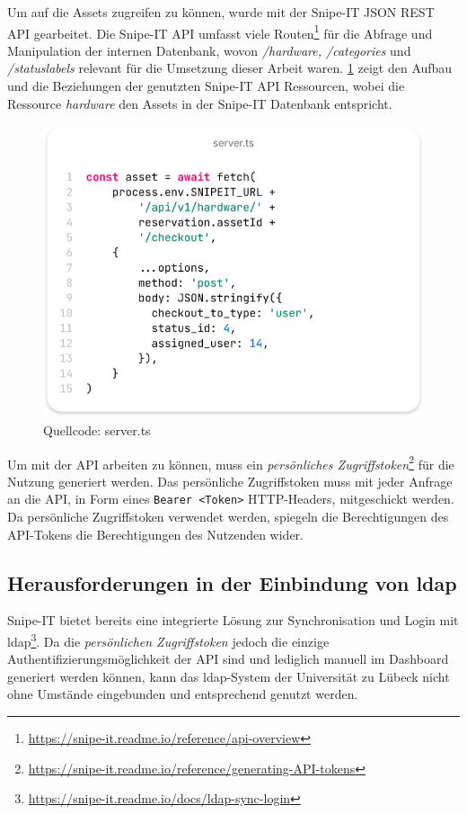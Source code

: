 Um auf die Assets zugreifen zu können, wurde mit der Snipe-IT JSON REST API gearbeitet. Die Snipe-IT
API umfasst viele Routen\footnote{\url{https://snipe-it.readme.io/reference/api-overview}} für die
Abfrage und Manipulation der internen Datenbank, wovon \textit{/hardware, /categories} und
\textit{/statuslabels} relevant für die Umsetzung dieser Arbeit waren. \ref{fig:snipe} zeigt den
Aufbau und die Beziehungen der genutzten Snipe-IT API Ressourcen, wobei die Ressource
\textit{hardware} den Assets in der Snipe-IT Datenbank entspricht.
\begin{figure}[h]
  \centering
  \includegraphics[scale=0.4]{Bilder/Code/serverts.png}
  \caption[Quellcode: server.ts]{Quellcode: server.ts}
  \label{fig:snipe}
\end{figure}

Um mit der API arbeiten zu können, muss ein \textit{persönliches
  Zugriffstoken}\footnote{\url{https://snipe-it.readme.io/reference/generating-API-tokens}} für die
Nutzung generiert werden. Das persönliche Zugriffstoken muss mit jeder Anfrage an die API, in Form
eines \lstinline{Bearer <Token>} HTTP-Headers, mitgeschickt werden. Da persönliche Zugriffstoken
verwendet werden, spiegeln die Berechtigungen des API-Tokens die Berechtigungen des Nutzenden
wider.

\subsection{Herausforderungen in der Einbindung von \ac{ldap}}
\label{subsec:heraus}
Snipe-IT bietet bereits eine integrierte Lösung zur Synchronisation und Login mit
\ac{ldap}\footnote{\url{https://snipe-it.readme.io/docs/ldap-sync-login}}. Da die \textit{persönlichen
  Zugriffstoken} jedoch die einzige Authentifizierungsmöglichkeit der API sind und lediglich manuell
im Dashboard generiert werden können, kann das \ac{ldap}-System der Universität zu Lübeck nicht ohne
Umstände eingebunden und entsprechend genutzt werden.

